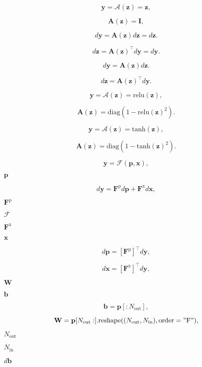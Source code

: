 \documentclass{article}
\begin{document}
\[ \mathbf{y} = \mathcal{A}(\mathbf{z}) = \mathbf{z},\]
\pagebreak

\[ \mathbf{A}(\mathbf{z}) = \mathbf{I},\]
\pagebreak

\[ d\mathbf{y} = \mathbf{A}(\mathbf{z}) d\mathbf{z} = d\mathbf{z}.\]
\pagebreak

\[ d\mathbf{z} = \mathbf{A}(\mathbf{z})^\top d\mathbf{y} = d\mathbf{y}.\]
\pagebreak

\[ d\mathbf{y} = \mathbf{A}(\mathbf{z}) d\mathbf{z}.\]
\pagebreak

\[ d\mathbf{z} = \mathbf{A}(\mathbf{z})^\top d\mathbf{y}.\]
\pagebreak

\[ \mathbf{y} = \mathcal{A}(\mathbf{z}) = \mathrm{relu}(\mathbf{z}),\]
\pagebreak

\[ \mathbf{A}(\mathbf{z}) = \mathrm{diag}(1-\mathrm{relu}(\mathbf{z})^2).\]
\pagebreak

\[ \mathbf{y} = \mathcal{A}(\mathbf{z}) = \mathrm{tanh}(\mathbf{z}),\]
\pagebreak

\[ \mathbf{A}(\mathbf{z}) = \mathrm{diag}(1-\mathrm{tanh}(\mathbf{z})^2).\]
\pagebreak

\[ \mathbf{y} = \mathcal{F}(\mathbf{p}, \mathbf{x}),\]
\pagebreak

$\mathbf{p}$
\pagebreak

\[ d\mathbf{y} = \mathbf{F}^\mathrm{p}d\mathbf{p} + 
 \mathbf{F}^\mathrm{x}d\mathbf{x},\]
\pagebreak

$\mathbf{F}^\mathrm{p}$
\pagebreak

$\mathcal{F}$
\pagebreak

$\mathbf{F}^\mathrm{x}$
\pagebreak

$\mathbf{x}$
\pagebreak

\[ d\mathbf{p} = [\mathbf{F}^\mathrm{p}]^\top d\mathbf{y},\]
\pagebreak

\[ d\mathbf{x} = [\mathbf{F}^\mathrm{x}]^\top d\mathbf{y},\]
\pagebreak

$\mathbf{W}$
\pagebreak

$\mathbf{b}$
\pagebreak

\[ \mathbf{b} = \mathbf{p}[:N_{\mathrm{out}}],\]
\pagebreak

\[ \mathbf{W} = \mathbf{p}[N_{\mathrm{out}}:].\mathrm{reshape}((N_{\mathrm{out}}, 
 N_{\mathrm{in}}), \mathrm{order="F"}),\]
\pagebreak

$N_{\mathrm{out}}$
\pagebreak

$N_{\mathrm{in}}$
\pagebreak

$d\mathbf{b}$
\pagebreak
\end{document}
